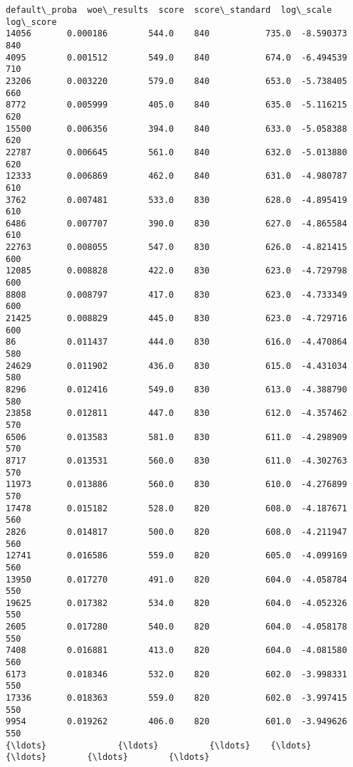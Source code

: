 \documentclass[11pt]{article}
\begin{document}
    \begin{Verbatim}[commandchars=\\\{\}]
       default\_proba  woe\_results  score  score\_standard  log\_scale  log\_score
14056       0.000186        544.0    840           735.0  -8.590373        840
4095        0.001512        549.0    840           674.0  -6.494539        710
23206       0.003220        579.0    840           653.0  -5.738405        660
8772        0.005999        405.0    840           635.0  -5.116215        620
15500       0.006356        394.0    840           633.0  -5.058388        620
22787       0.006645        561.0    840           632.0  -5.013880        620
12333       0.006869        462.0    840           631.0  -4.980787        610
3762        0.007481        533.0    830           628.0  -4.895419        610
6486        0.007707        390.0    830           627.0  -4.865584        610
22763       0.008055        547.0    830           626.0  -4.821415        600
12085       0.008828        422.0    830           623.0  -4.729798        600
8808        0.008797        417.0    830           623.0  -4.733349        600
21425       0.008829        445.0    830           623.0  -4.729716        600
86          0.011437        444.0    830           616.0  -4.470864        580
24629       0.011902        436.0    830           615.0  -4.431034        580
8296        0.012416        549.0    830           613.0  -4.388790        580
23858       0.012811        447.0    830           612.0  -4.357462        570
6506        0.013583        581.0    830           611.0  -4.298909        570
8717        0.013531        560.0    830           611.0  -4.302763        570
11973       0.013886        560.0    830           610.0  -4.276899        570
17478       0.015182        528.0    820           608.0  -4.187671        560
2826        0.014817        500.0    820           608.0  -4.211947        560
12741       0.016586        559.0    820           605.0  -4.099169        560
13950       0.017270        491.0    820           604.0  -4.058784        550
19625       0.017382        534.0    820           604.0  -4.052326        550
2605        0.017280        540.0    820           604.0  -4.058178        550
7408        0.016881        413.0    820           604.0  -4.081580        560
6173        0.018346        532.0    820           602.0  -3.998331        550
17336       0.018363        559.0    820           602.0  -3.997415        550
9954        0.019262        406.0    820           601.0  -3.949626        550
{\ldots}              {\ldots}          {\ldots}    {\ldots}             {\ldots}        {\ldots}        {\ldots}

\end{Verbatim}
\end{document}
